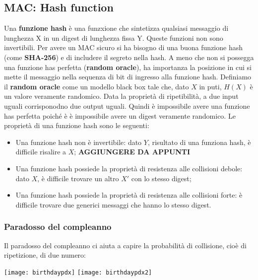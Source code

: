 \documentclass{article}
\theoremstyle{remark}
\begin{document}
\subsection{MAC: Hash function}
Una \textbf{funzione hash} è una funzxione che sintetizza qualsiasi messaggio di lunghezza X in un digest di lunghezza fissa Y. Queste funzioni non sono invertibili.
Per avere un MAC sicuro si ha bisogno di una buona funzione hash (come \textbf{SHA-256}) e di includere il segreto nella hash. A meno che non si possegga una funzione has perfetta (\textbf{random oracle}), ha importanza la posizione in cui si mette il messaggio nella sequenza di bit di ingresso alla funzione hash.
Definiamo il \textbf{random oracle} come un modello black box tale che, dato $X$ in puti, $H(X)$ è un valore veramente randomico.
Data la proprietà di ripetibilità, a due input uguali corrisponodno due output uguali. Quindi è impossibile avere una funzione has perfetta poiché è è impossibile avere un digest veramente randomico.
Le proprietà di una funzione hash sono le seguenti:
\begin{itemize}
	\item Una funzione hash non è invertibile: dato $Y$, risultato di una funziona hash, è difficile risalire a $X$;
	      \textbf{AGGIUNGERE DA APPUNTI}
	\item Una funzione hash possiede la proprietà di resistenza alle collisioni debole: dato $X$, è difficile trovare un altro $X'$ con lo stesso digest;
	\item Una funzione hash possiede la proprietà di resistenza alle collisioni forte: è difficile trovare due generici messaggi che hanno lo stesso digest.
\end{itemize}
\subsubsection{Paradosso del compleanno}
Il paradosso del compleanno ci aiuta a capire la probabilità di collisione, cioè di ripetizione, di due numero:
\begin{center}
	\texttt{[image: birthdaypdx]}
	\texttt{[image: birthdaypdx2]}
\end{center}
\end{document}

